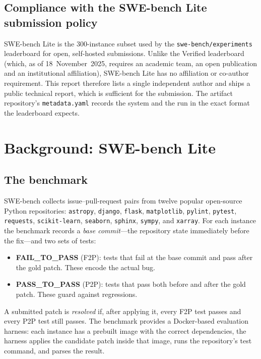\documentclass[11pt,a4paper]{article}
\begin{document}
\subsection{Compliance with the SWE-bench Lite submission policy}

SWE-bench Lite is the 300-instance subset used by the \texttt{swe-bench/experiments}
leaderboard for open, self-hosted submissions. Unlike the Verified leaderboard (which, as
of 18~November~2025, requires an academic team, an open publication and an institutional
affiliation), SWE-bench Lite has no affiliation or co-author requirement. This report
therefore lists a single independent author and ships a public technical report, which is
sufficient for the submission. The artifact repository's \texttt{metadata.yaml} records
the system and the run in the exact format the leaderboard expects.

\section{Background: SWE-bench Lite}

\subsection{The benchmark}

SWE-bench \cite{jimenez2024swebench} collects issue--pull-request pairs from twelve
popular open-source Python repositories: \texttt{astropy}, \texttt{django},
\texttt{flask}, \texttt{matplotlib}, \texttt{pylint}, \texttt{pytest}, \texttt{requests},
\texttt{scikit-learn}, \texttt{seaborn}, \texttt{sphinx}, \texttt{sympy}, and
\texttt{xarray}. For each instance the benchmark records a \emph{base commit}---the
repository state immediately before the fix---and two sets of tests:

\begin{itemize}[leftmargin=1.4em]
  \item \textbf{FAIL\_TO\_PASS} (F2P): tests that fail at the base commit and pass after
  the gold patch. These encode the actual bug.
  \item \textbf{PASS\_TO\_PASS} (P2P): tests that pass both before and after the gold
  patch. These guard against regressions.
\end{itemize}

A submitted patch is \emph{resolved} if, after applying it, every F2P test passes and
every P2P test still passes. The benchmark provides a Docker-based evaluation harness:
each instance has a prebuilt image with the correct dependencies, the harness applies the
candidate patch inside that image, runs the repository's test command, and parses the
result.
\end{document}
